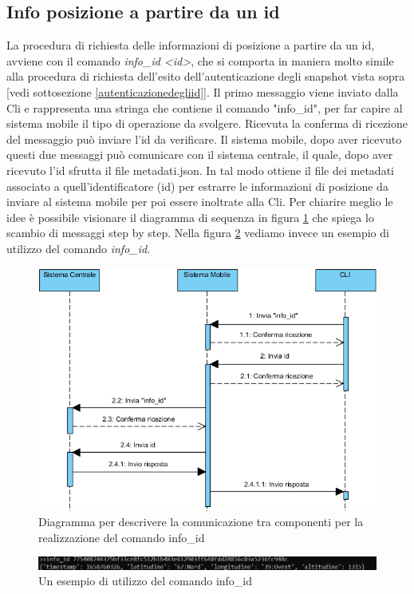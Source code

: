 \subsection{Info posizione a partire da un id}
La procedura di richiesta delle informazioni di posizione a partire da un id, avviene con il comando \textit{info\_id <id>}, che si comporta in maniera molto simile alla procedura di richiesta dell'esito dell'autenticazione degli snapshot vista sopra [vedi sottosezione \ref{autenticazionedegliid}]. Il primo messaggio viene inviato dalla Cli e rappresenta una stringa che contiene il comando "info\_id", per far capire al sistema mobile il tipo di operazione da svolgere. Ricevuta la conferma di ricezione del messaggio può inviare l'id da verificare. Il sistema mobile, dopo aver ricevuto questi due messaggi può comunicare con il sistema centrale, il quale, dopo aver ricevuto l'id sfrutta il file metadati.json. In tal modo ottiene il file dei metadati associato a quell'identificatore (id) per estrarre le informazioni di posizione da inviare al sistema mobile per poi essere inoltrate alla Cli. Per chiarire meglio le idee è possibile visionare il diagramma di sequenza in figura \ref{fig: informazioni_id } che spiega lo scambio di messaggi step by step. Nella figura \ref{fig: info_id2 } vediamo invece un esempio di utilizzo del comando \textit{info\_id}.
\begin{figure}[!h]
\centering
\includegraphics[scale=0.8]{images/info_id.png}
\caption{Diagramma per descrivere la comunicazione tra componenti per la realizzazione del comando info\_id}
\label{fig: informazioni_id }
\end{figure}
\begin{figure}[!h]
\centering
\includegraphics[scale=0.8]{images/info_id2.png}
\caption{Un esempio di utilizzo del comando info\_id}
\label{fig: info_id2 }
\end{figure}

